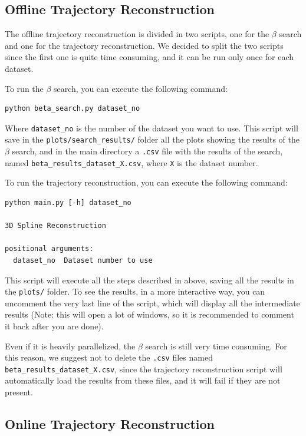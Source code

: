 \documentclass[11pt]{article}
\begin{document}
\subsection{Offline Trajectory Reconstruction}

The offline trajectory reconstruction is divided in two scripts, one for the $\beta$ search and one for the trajectory reconstruction. We decided to split the two scripts since the first one is quite time consuming, and it can be run only once for each dataset. 

To run the $\beta$ search, you can execute the following command:

\begin{verbatim}
python beta_search.py dataset_no
\end{verbatim}

Where \texttt{dataset\_no} is the number of the dataset you want to use. This script will save in the \texttt{plots/search\_results/} folder all the plots showing the results of the $\beta$ search, and in the main directory a \texttt{.csv} file with the results of the search, named \texttt{beta\_results\_dataset\_X.csv}, where \texttt{X} is the dataset number.

To run the trajectory reconstruction, you can execute the following command:

\begin{verbatim}
python main.py [-h] dataset_no

3D Spline Reconstruction

positional arguments:
  dataset_no  Dataset number to use
\end{verbatim}

This script will execute all the steps described in above, saving all the results in the \texttt{plots/} folder. To see the results, in a more interactive way, you can uncomment the very last line of the script, which will display all the intermediate results (Note: this will open a lot of windows, so it is recommended to comment it back after you are done).

Even if it is heavily parallelized, the $\beta$ search is still very time consuming. For this reason, we suggest not to delete the \texttt{.csv} files named \texttt{beta\_results\_dataset\_X.csv}, since the trajectory reconstruction script will automatically load the results from these files, and it will fail if they are not present. 

\subsection{Online Trajectory Reconstruction}
\end{document}
